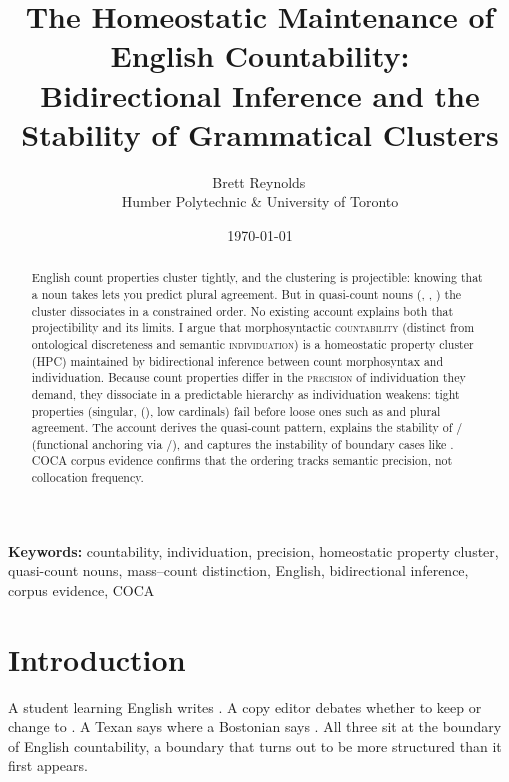 \documentclass[12pt,a4paper]{article}
\title{The Homeostatic Maintenance of English Countability:\\Bidirectional Inference and the Stability of Grammatical Clusters}
\author{Brett Reynolds\,\orcidlink{0000-0003-0073-7195}\\Humber Polytechnic \& University of Toronto}
\date{\today}
\begin{document}
\maketitle

\noindent\textbf{Keywords:} countability, individuation, precision, homeostatic property cluster, quasi-count nouns, mass--count distinction, English, bidirectional inference, corpus evidence, COCA

\begin{abstract}
English count properties cluster tightly, and the clustering is projectible: knowing that a noun takes  lets you predict plural agreement. But in quasi-count nouns (, , ) the cluster dissociates in a constrained order. No existing account explains both that projectibility and its limits. I argue that morphosyntactic \textsc{countability} (distinct from ontological discreteness and semantic \textsc{individuation}) is a homeostatic property cluster (HPC) maintained by bidirectional inference between count morphosyntax and individuation. Because count properties differ in the \textsc{precision} of individuation they demand, they dissociate in a predictable hierarchy as individuation weakens: tight properties (singular, (), low cardinals) fail before loose ones such as  and plural agreement. The account derives the quasi-count pattern, explains the stability of / (functional anchoring via /), and captures the instability of boundary cases like . COCA corpus evidence confirms that the ordering tracks semantic precision, not collocation frequency.
\end{abstract}

\section{Introduction}

A student learning English writes . A copy editor debates whether to keep  or change to . A Texan says  where a Bostonian says . All three sit at the boundary of English countability, a boundary that turns out to be more structured than it first appears.
\end{document}

